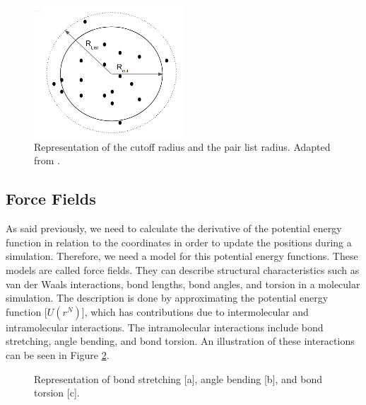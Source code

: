\begin{figure}[h]
	\centering
	\includegraphics[width=0.5\textwidth]{Figures/pairlist}
	\caption{Representation of the cutoff radius and the pair list radius. Adapted from .}
	\label{fig:pairlist}
\end{figure}

\subsection{Force Fields }
As said previously, we need to calculate the derivative of the potential energy function in relation to the coordinates in order to update the positions during a simulation. Therefore, we need a model for this potential energy functions. These models are called force fields. They can describe structural characteristics such as van der Waals interactions, bond lengths, bond angles, and torsion in a molecular simulation. The description is done by approximating the potential energy function [$U(r^N)$], which has contributions due to intermolecular and intramolecular interactions. The intramolecular interactions include bond stretching, angle bending, and bond torsion. An illustration of these interactions can be seen in Figure \ref{fig:intraint}. 

\begin{figure}[H]
	\caption{Representation of bond stretching [a], angle bending [b], and bond torsion [c].}%
	\label{fig:intraint}%
\end{figure}


